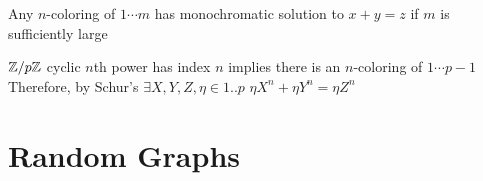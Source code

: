 \begin{proposition}
    Any \(n\)-coloring of \(1\cdots m\) has monochromatic solution to \(x + y = z\)  if \(m\) is sufficiently large
\end{proposition} 

\(\mathbb{Z} / p \mathbb{Z}\) cyclic \(n\)th power has index \(n\) implies there is an \(n\)-coloring of \(1 \cdots p - 1\) Therefore, by Schur's \(\exists X,Y, Z, \eta  \in {1 .. p}\) \(\eta X^n + \eta Y^n = \eta Z^n\)

\section{Random Graphs}
